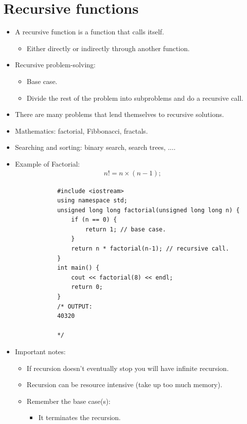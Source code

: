 \section{Recursive functions}
\begin{itemize}
    \item A recursive function is a function that calls itself.
        \begin{itemize}
            \item Either directly or indirectly through another function.
        \end{itemize}
    
    \item Recursive problem-solving:
        \begin{itemize}
            \item Base case.
            \item Divide the rest of the problem into subproblems and do a recursive call.
        \end{itemize}
    
    \item There are many problems that lend themselves to recursive solutions.
    \item Mathematics: factorial, Fibbonacci, fractals.
    \item Searching and sorting: binary search, search trees, ....
    \item Example of Factorial:
        \begin{align*}
            n! = n \times (n - 1);
        \end{align*}
        \begin{verbatim}
            #include <iostream>
            using namespace std;
            unsigned long long factorial(unsigned long long n) {
                if (n == 0) {
                    return 1; // base case.
                }
                return n * factorial(n-1); // recursive call.
            }
            int main() {
                cout << factorial(8) << endl;
                return 0;
            }
            /* OUTPUT:
            40320

            */
        \end{verbatim}
    
    \item Important notes:
        \begin{itemize}
            \item If recursion doesn't eventually stop you will have infinite recursion.
            \item Recursion can be resource intensive (take up too much memory).
            \item Remember the base case(s):
                \begin{itemize}
                    \item It terminates the recursion.
                \end{itemize}
            

\end{itemize}
\end{itemize}
